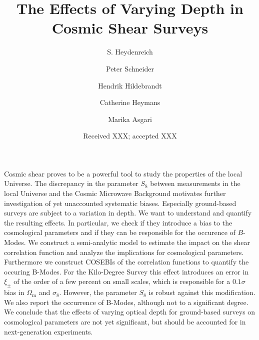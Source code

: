 \documentclass[referee]{aa} %
\renewcommand{\[}{\begin{equation}}
\renewcommand{\]}{\end{equation}}
\renewcommand{\rm}{\mathrm}
\begin{document}
 


   \title{The Effects of Varying Depth in Cosmic Shear Surveys}


   \author{S. Heydenreich%
          \and Peter Schneider 
          \and Hendrik Hildebrandt
          \and Catherine Heymans 
          \and Marika Asgari
          }

   \date{Received XXX; accepted XXX}

  \abstract
   {Cosmic shear proves to be a powerful tool to study the properties of the local Universe. The discrepancy in the parameter $S_8$ between measurements in the local Universe and the Cosmic Microwave Background motivates further investigation of yet unaccounted systematic biases. 
   Especially ground-based surveys are subject to a variation in depth. We want to understand and quantify the resulting effects. In particular, we check if they introduce a bias to the cosmological parameters and if they can be responsible for the occurence of $B$-Modes.
   We construct a semi-analytic model to estimate the impact on the shear correlation function and analyze the implications for cosmological parameters. Furthermore we construct COSEBIs of the correlation functions to quantify the occuring B-Modes.
   For the Kilo-Degree Survey this effect introduces an error in $\xi_\pm$ of the order of a few percent on small scales, which is responsible for a $0.1\sigma$ bias in $\Omega_{\rm m}$ and $\sigma_8$. However, the parameter $S_8$ is robust against this modification. We also report the occurrence of B-Modes, although not to a significant degree.
   We conclude that the effects of varying optical depth for ground-based surveys on cosmological parameters are not yet significant, but should be accounted for in next-generation experiments.}

\end{document}
